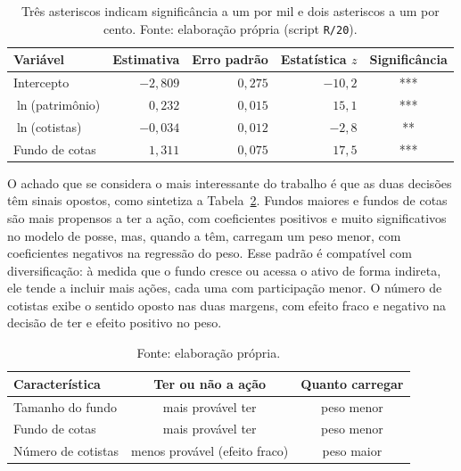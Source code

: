 \documentclass[12pt,a4paper]{article}
\begin{document}
\begin{table}[h]\centering\small
\caption{Modelo logístico da probabilidade de o fundo deter VALE3 (painel extensivo de fundos de
ações, 10.286 observações).}
\label{tab:posse}
\begin{tabular}{@{}lrrrc@{}}
\toprule
Variável & Estimativa & Erro padrão & Estatística $z$ & Significância \\
\midrule
Intercepto        & $-2{,}809$ & $0{,}275$ & $-10{,}2$ & *** \\
$\ln$(patrimônio) & $0{,}232$  & $0{,}015$ & $15{,}1$  & *** \\
$\ln$(cotistas)   & $-0{,}034$ & $0{,}012$ & $-2{,}8$  & ** \\
Fundo de cotas    & $1{,}311$  & $0{,}075$ & $17{,}5$  & *** \\
\bottomrule
\end{tabular}
\caption*{\footnotesize Três asteriscos indicam significância a um por mil e dois asteriscos a um
por cento. Fonte: elaboração própria (script \texttt{R/20}).}
\end{table}

O achado que se considera o mais interessante do trabalho é que as duas decisões têm sinais
opostos, como sintetiza a Tabela~\ref{tab:margens}. Fundos maiores e fundos de cotas são mais
propensos a ter a ação, com coeficientes positivos e muito significativos no modelo de posse, mas,
quando a têm, carregam um peso menor, com coeficientes negativos na regressão do peso. Esse padrão é
compatível com diversificação: à medida que o fundo cresce ou acessa o ativo de forma indireta, ele
tende a incluir mais ações, cada uma com participação menor. O número de cotistas exibe o sentido
oposto nas duas margens, com efeito fraco e negativo na decisão de ter e efeito positivo no peso.

\begin{table}[h]\centering\small
\caption{Sinais opostos entre a decisão de ter a ação e a decisão de quanto carregar.}
\label{tab:margens}
\begin{tabular}{@{}lcc@{}}
\toprule
Característica & Ter ou não a ação & Quanto carregar \\
\midrule
Tamanho do fundo   & mais provável ter & peso menor \\
Fundo de cotas     & mais provável ter & peso menor \\
Número de cotistas & menos provável (efeito fraco) & peso maior \\
\bottomrule
\end{tabular}
\caption*{\footnotesize Fonte: elaboração própria.}
\end{table}
\end{document}
